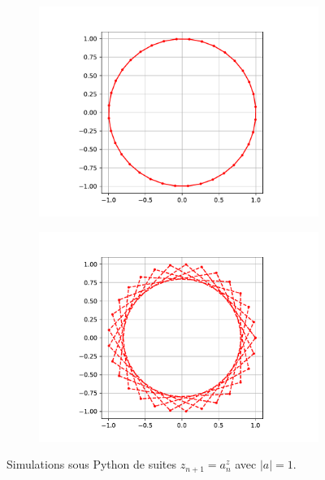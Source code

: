 \documentclass[12pt]{article}
\theoremstyle{definition}
\begin{document}
\begin{figure}[H]
	\centering
	\begin{subfigure}{0.84\textwidth}
	\includegraphics[width=\textwidth]{resources/periodico.pdf}
	\end{subfigure}
	
	
	\begin{subfigure}{0.84\textwidth}
	\includegraphics[width=\textwidth]{resources/notperiodico.pdf}
	\end{subfigure}
	\caption{Simulations sous Python de suites $z_{n+1} = a^z_n$ avec $|a| = 1$.}
\end{figure}
\end{document}
